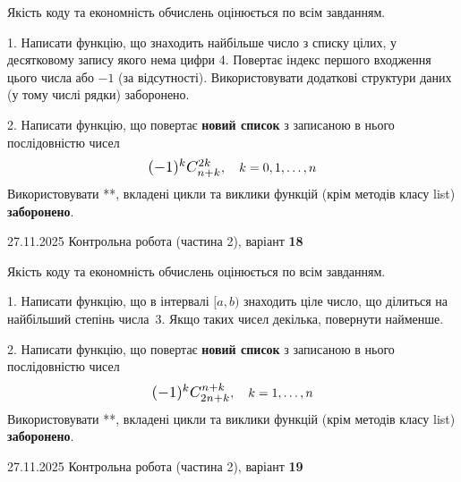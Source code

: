 \documentclass[11pt, ukrainian]{article}
\begin{document}
{{{{{{{{{{{{{{{{{
\begin {large}
Якість коду та економність обчислень оцінюється по всім завданням.


1. Написати функцію, що знаходить найбільше число з списку цілих, у десятковому запису якого нема цифри 4. Повертає індекс першого входження цього числа або $-1$ (за відсутності). Використовувати додаткові структури даних (у тому числі рядки) заборонено.


2. 
Написати функцію, що повертає \textbf{новий список} з записаною в нього послідовністю чисел
$$\scalebox{1.2}{$(-1)^{k}C_{n+k}^{2k}$}, \quad k=0,1,\ldots,n$$
Використовувати **, вкладені цикли та виклики функцій (крім методів класу list) \textbf{заборонено}.

\end{large}
\newpage
{{27.11.2025 Контрольна робота  (частина 2), варіант  \No \textbf { 18 }\par}}


{
\begin {large}
Якість коду та економність обчислень оцінюється по всім завданням.


1. Написати функцію, що в інтервалі $[a, b)$ знаходить ціле число, що ділиться на найбільший степінь числа 3. Якщо таких чисел декілька, повернути найменше.


2. 
Написати функцію, що повертає \textbf{новий список} з записаною в нього послідовністю чисел
$$\scalebox{1.2}{$(-1)^{k}C_{2n+k}^{n+k}$}, \quad k=1,\ldots,n$$
Використовувати **, вкладені цикли та виклики функцій (крім методів класу list) \textbf{заборонено}.

\end{large}
\newpage
{{27.11.2025 Контрольна робота  (частина 2), варіант  \No \textbf { 19 }\par}}

}}}}}}}}}}}}}}}}}}
\end{document}

